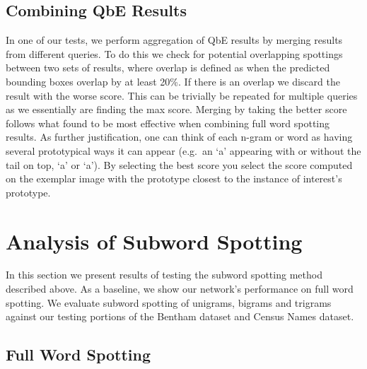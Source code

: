 \documentclass[ms,electronic,twosidetoc,letterpaper,chaptercenter,parttop,lof,lot]{byumsphd}
\begin{document}

\subsection{Combining QbE Results}\label{combine}

In one of our tests, we perform aggregation of QbE results by merging results from different queries. To do this we check for potential overlapping spottings between two sets of results, where overlap is defined as when the predicted bounding boxes overlap by at least 20\%. If there is an overlap we discard the result with the worse score. This can be trivially be repeated for multiple queries as we essentially are finding the max score. Merging by taking the better score follows what \cite{Zagoris2015} found to be most effective when combining full word spotting results. As further justification, one can think of each n-gram or word as having several prototypical ways it can appear (e.g.~an `a' appearing with or without the tail on top, `\textsf{a}' or `{\selectfont\footnotesize a}'). By selecting the best score you select the score computed on the exemplar image with the prototype closest to the instance of interest's prototype.



\section{Analysis of Subword Spotting}

In this section we present results of testing the subword spotting method described above.
As a baseline, we show our network's performance on full word spotting. We evaluate subword spotting of unigrams, bigrams and trigrams against our testing portions of the Bentham dataset and Census Names dataset. 

\subsection{Full Word Spotting}
\end{document}
